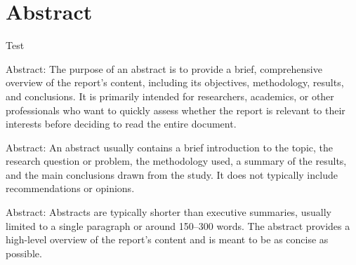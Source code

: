 \documentclass{article}
\begin{document}

    \section*{Abstract}\label{sec:abstract}

    Test\cite{lol}

    \newpage

    \tableofcontents

    \newpage

    \newpage

    \iffalse

    Abstract: The purpose of an abstract is to provide a brief, comprehensive
    overview of the report's content, including its objectives, methodology,
    results, and conclusions.
    It is primarily intended for researchers, academics, or other professionals who want to quickly assess whether the
    report is relevant to their interests before deciding to read the entire document.

    Abstract: An abstract usually contains a brief introduction to the topic, the research question or problem,
    the methodology used, a summary of the results, and the main conclusions drawn from the study.
    It does not typically include recommendations or opinions.

    Abstract: Abstracts are typically shorter than executive summaries, usually limited to a single paragraph or around
    150--300 words.
    The abstract provides a high-level overview of the report's content and is meant to be as concise as possible.
\end{document}
